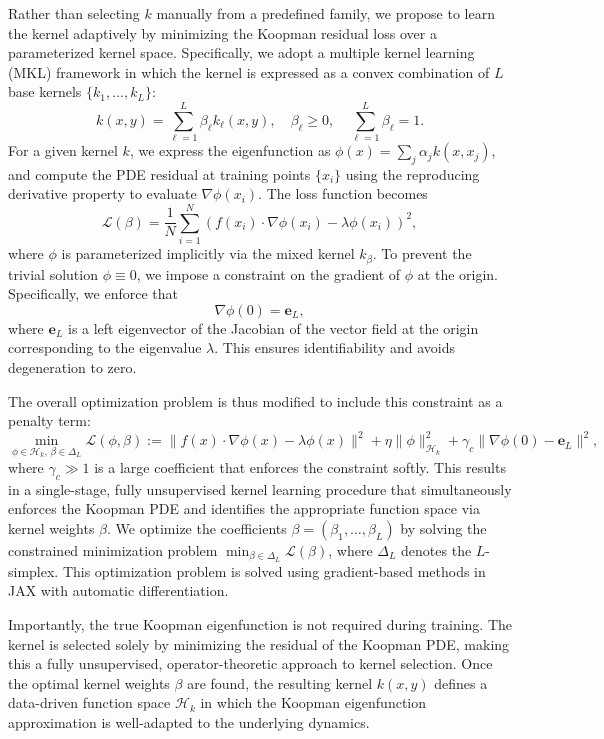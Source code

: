 \documentclass[11pt]{article}
\theoremstyle{plain}
\def\[{\begin{equation}}
\def\]{\end{equation}}
\begin{document}
Rather than selecting $k$ manually from a predefined family, we propose to learn the kernel adaptively by minimizing the Koopman residual loss over a parameterized kernel space. Specifically, we adopt a multiple kernel learning (MKL) framework in which the kernel is expressed as a convex combination of $L$ base kernels $\{k_1, \dots, k_L\}$:
\[
k(x, y) = \sum_{\ell=1}^L \beta_\ell k_\ell(x, y), \quad \beta_\ell \geq 0, \quad \sum_{\ell=1}^L \beta_\ell = 1.
\]
For a given kernel $k$, we express the eigenfunction as $\phi(x) = \sum_j \alpha_j k(x, x_j)$, and compute the PDE residual at training points $\{x_i\}$ using the reproducing derivative property to evaluate $\nabla \phi(x_i)$. The loss function becomes
\[
\mathcal{L}(\beta) = \frac{1}{N} \sum_{i=1}^N \left( f(x_i) \cdot \nabla \phi(x_i) - \lambda \phi(x_i) \right)^2,
\]
where $\phi$ is parameterized implicitly via the mixed kernel $k_\beta$. To prevent the trivial solution \( \phi \equiv 0 \), we impose a constraint on the gradient of \( \phi \) at the origin. Specifically, we enforce that
\[
\nabla \phi(0) = \mathbf{e}_L,
\]
where \( \mathbf{e}_L \) is a left eigenvector of the Jacobian of the vector field at the origin corresponding to the eigenvalue \( \lambda \). This ensures identifiability and avoids degeneration to zero.

The overall optimization problem is thus modified to include this constraint as a penalty term:
\[
\min_{\phi \in \mathcal{H}_k,\, \beta \in \Delta_L} \mathcal{L}(\phi, \beta) := \| f(x) \cdot \nabla \phi(x) - \lambda \phi(x) \|^2 + \eta \|\phi\|^2_{\mathcal{H}_k} + \gamma_c \| \nabla \phi(0) - \mathbf{e}_L \|^2,
\]
where \( \gamma_c \gg 1 \) is a large coefficient that enforces the constraint softly. This results in a single-stage, fully unsupervised kernel learning procedure that simultaneously enforces the Koopman PDE and identifies the appropriate function space via kernel weights \( \beta \). We optimize the coefficients $\beta = (\beta_1, \dots, \beta_L)$ by solving the constrained minimization problem
$\min_{\beta \in \Delta_L} \mathcal{L}(\beta)$, where $\Delta_L$ denotes the $L$-simplex. This optimization problem is solved using gradient-based methods in JAX with automatic differentiation.

Importantly, the true Koopman eigenfunction is not required during training. The kernel is selected solely by minimizing the residual of the Koopman PDE, making this a fully unsupervised, operator-theoretic approach to kernel selection. Once the optimal kernel weights $\beta$ are found, the resulting kernel $k(x, y)$ defines a data-driven function space $\mathcal{H}_k$ in which the Koopman eigenfunction approximation is well-adapted to the underlying dynamics.
\end{document}
